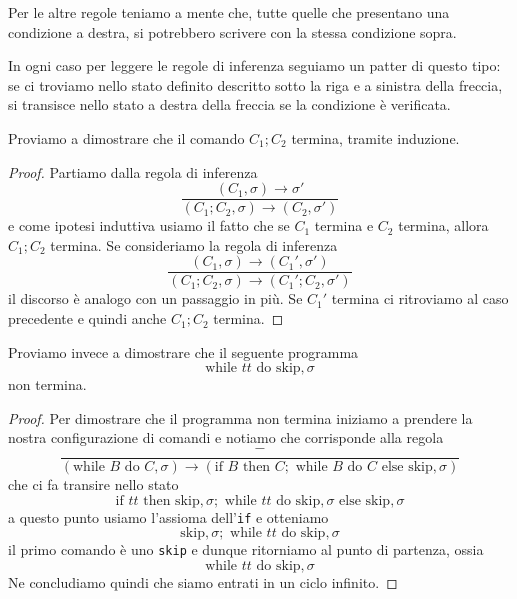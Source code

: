 Per le altre regole teniamo a mente che, tutte quelle che
presentano una condizione a destra, si potrebbero scrivere
con la stessa condizione sopra.

In ogni caso per leggere le regole di inferenza seguiamo un
patter di questo tipo: se ci troviamo nello stato definito
descritto sotto la riga e a sinistra della freccia, si
transisce nello stato a destra della freccia se la condizione
è verificata.

\begin{example}
	Proviamo a dimostrare che il comando $C_1 ; C_2$ termina,
	tramite induzione.
	\begin{proof}
		Partiamo dalla regola di inferenza
		\[
			\frac{(C_1, \sigma) \to \sigma'}
			{(C_1 ; C_2, \sigma) \to (C_2 , \sigma')}
		\]
		e come ipotesi induttiva usiamo il fatto che se
		$C_1$ termina e $C_2$ termina, allora $C_1 ; C_2$
		termina. Se consideriamo la regola di inferenza
		\[
			\frac{(C_1, \sigma) \to (C_1', \sigma')}
			{(C_1 ; C_2, \sigma) \to (C_1' ; C_2 , \sigma')}
		\]
		il discorso è analogo con un passaggio in più. Se
		$C_1'$ termina ci ritroviamo al caso precedente e
		quindi anche $C_1 ; C_2$ termina.
	\end{proof}
\end{example}

\begin{example}
	Proviamo invece a dimostrare che il seguente programma
	\[ \text{while } tt \text{ do} \text{ skip}, \sigma \]
	non termina.
	\begin{proof}
		Per dimostrare che il programma non termina iniziamo
		a prendere la nostra configurazione di comandi e
		notiamo che corrisponde alla regola
		\[
			\frac{-}{(\text{while } B \text{ do } C, \sigma)
				\to (\text{if } B \text{ then } C;
				\text{ while } B \text{ do } C
				\text{ else skip}, \sigma )}
		\]
		che ci fa transire nello stato
		\[
			\text{if } tt \text{ then skip}, \sigma;
			\text{ while } tt \text{ do skip}, \sigma
			\text{ else skip}, \sigma
		\]
		a questo punto usiamo l'assioma dell'\verb|if| e
		otteniamo
		\[
			\text{skip}, \sigma ; \text{ while } tt
			\text{ do skip}, \sigma
		\]
		il primo comando è uno \verb|skip| e dunque ritorniamo
		al punto di partenza, ossia
		\[ \text{while } tt \text{ do} \text{ skip}, \sigma \]
        Ne concludiamo quindi che siamo entrati in un ciclo
        infinito.
	\end{proof}
\end{example}
